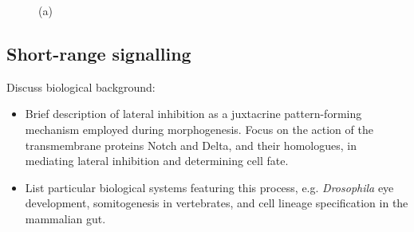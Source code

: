 \documentclass{article}
\begin{document}
\begin{figure}
{\label{fig:CryptStats:e}
}
\caption{(a)}
\label{fig:CryptStats:metrics}
\end{figure}



\subsection{Short-range signalling} \label{sec:juxtacrine}

Discuss biological background:
\begin{itemize}
\item Brief description of lateral inhibition as a juxtacrine pattern-forming mechanism employed during morphogenesis. Focus on the action of the transmembrane proteins Notch and Delta, and their homologues, in mediating lateral inhibition and determining cell fate.
\item List particular biological systems featuring this process, e.g. {\it Drosophila} eye development, somitogenesis in vertebrates, and cell lineage specification in the mammalian gut.
\end{itemize}
\end{document}
